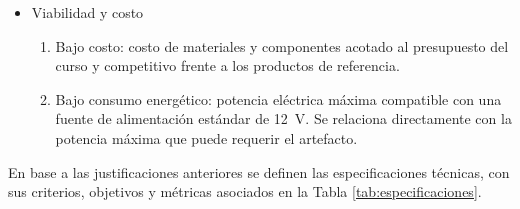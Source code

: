 \documentclass[12pt, a4paper]{article}
\begin{document}
\begin{itemize}
\begin{enumerate}
        \item Inocuidad: toda superficie en contacto con agua de consumo debe ser de material apto para uso alimentario y no transferir olor ni sabor.
        \item Protección integral al usuario: superficies accesibles a temperatura segura al tacto, partes móviles cubiertas y electrónica protegida frente a goteo y condensación.
    \end{enumerate}
    \item Viabilidad y costo
    \begin{enumerate}
        \item Bajo costo: costo de materiales y componentes acotado al presupuesto del curso y competitivo frente a los productos de referencia.
        \item Bajo consumo energético: potencia eléctrica máxima compatible con una fuente de alimentación estándar de 12~V. Se relaciona directamente con la potencia máxima que puede requerir el artefacto.
    \end{enumerate}
\end{itemize}

En base a las justificaciones anteriores se definen las especificaciones técnicas, con sus criterios, objetivos y métricas asociados en la Tabla \ref{tab:especificaciones}.
\end{document}
